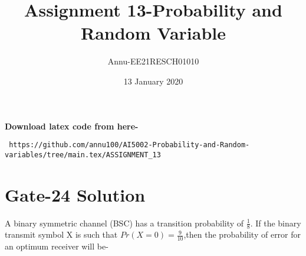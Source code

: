 \documentclass[journel,12pt,twocoloums]{IEEEtran}
\title{Assignment 13-Probability and Random Variable}
\author{Annu-EE21RESCH01010}
\date{13 January 2020}
\begin{document}
 \maketitle
\textbf{Download latex code from here-}\\
\begin{lstlisting}
 https://github.com/annu100/AI5002-Probability-and-Random-variables/tree/main.tex/ASSIGNMENT_13
 \end{lstlisting}

 \section{Gate-24 Solution}

A binary symmetric channel (BSC) has a transition
probability of $\frac{1}{8}$. If the binary transmit
symbol X is such that $Pr(X=0)=\frac{9}{10}$,then
the probability of error for an optimum receiver
will be-
\end{document}
